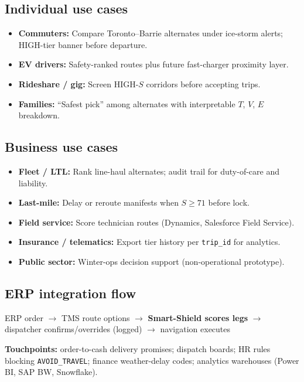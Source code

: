 \documentclass[11pt,a4paper]{article}
\begin{document}
\subsection*{Individual use cases}
\begin{itemize}[noitemsep]
  \item \textbf{Commuters:} Compare Toronto--Barrie alternates under ice-storm alerts; HIGH-tier banner before departure.
  \item \textbf{EV drivers:} Safety-ranked routes plus future fast-charger proximity layer.
  \item \textbf{Rideshare / gig:} Screen HIGH-$S$ corridors before accepting trips.
  \item \textbf{Families:} ``Safest pick'' among alternates with interpretable $T$, $V$, $E$ breakdown.
\end{itemize}

\subsection*{Business use cases}
\begin{itemize}[noitemsep]
  \item \textbf{Fleet / LTL:} Rank line-haul alternates; audit trail for duty-of-care and liability.
  \item \textbf{Last-mile:} Delay or reroute manifests when $S \geq 71$ before lock.
  \item \textbf{Field service:} Score technician routes (Dynamics, Salesforce Field Service).
  \item \textbf{Insurance / telematics:} Export tier history per \texttt{trip\_id} for analytics.
  \item \textbf{Public sector:} Winter-ops decision support (non-operational prototype).
\end{itemize}

\subsection*{ERP integration flow}
\begin{center}
\small
ERP order $\rightarrow$ TMS route options $\rightarrow$ \textbf{Smart-Shield scores legs} $\rightarrow$ dispatcher confirms/overrides (logged) $\rightarrow$ navigation executes
\end{center}

\noindent\textbf{Touchpoints:} order-to-cash delivery promises; dispatch boards; HR rules blocking \texttt{AVOID\_TRAVEL}; finance weather-delay codes; analytics warehouses (Power BI, SAP BW, Snowflake).
\end{document}
